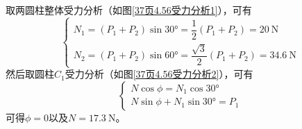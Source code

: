 \begin{solution}
取两圆柱整体受力分析（如图\ref{37页4.56受力分析1}），可有
\begin{equation*}
\begin{cases}
	N_1 = (P_1+P_2)\sin \ang{30} = \dfrac12 (P_1+P_2) = \SI{20}{\newton} \\
	N_2 = (P_1+P_2)\sin \ang{60} = \dfrac{\sqrt{3}}{2} (P_1+P_2) = \SI{34.6}{\newton}
\end{cases}
\end{equation*}
然后取圆柱$C_1$受力分析（如图\ref{37页4.56受力分析2}），可有
\begin{equation*}
\begin{cases}
	N \cos \phi = N_1 \cos \ang{30} \\
	N \sin \phi + N_1 \sin \ang{30} = P_1
\end{cases}
\end{equation*}
可得$\phi = 0$以及$N= \SI{17.3}{\newton}$。
\end{solution}

